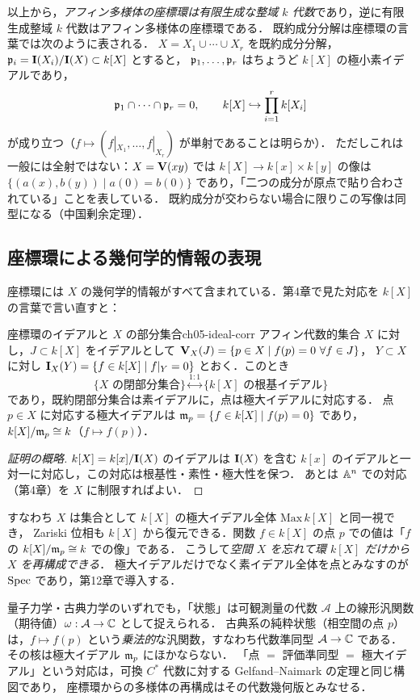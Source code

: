 以上から，\emph{アフィン多様体の座標環は有限生成な整域 $k$ 代数}であり，逆に有限生成整域 $k$ 代数はアフィン多様体の座標環である．
既約成分分解は座標環の言葉では次のように表される．
$X=X_1\cup\cdots\cup X_r$ を既約成分分解，$\mathfrak{p}_i=\mathbf{I}(X_i)/\mathbf{I}(X)\subset k[X]$ とすると，
$\mathfrak{p}_1,\dots,\mathfrak{p}_r$ はちょうど $k[X]$ の極小素イデアルであり，
\[
  \mathfrak{p}_1\cap\cdots\cap\mathfrak{p}_r=0,\qquad k[X]\hookrightarrow \prod_{i=1}^r k[X_i]
\]
が成り立つ（$f\mapsto(f|_{X_1},\dots,f|_{X_r})$ が単射であることは明らか）．
ただしこれは一般には全射ではない：$X=\mathbf{V}(xy)$ では $k[X]\to k[x]\times k[y]$ の像は
$\{(a(x),b(y))\mid a(0)=b(0)\}$ であり，「二つの成分が原点で貼り合わされている」ことを表している．
既約成分が交わらない場合に限りこの写像は同型になる（中国剰余定理）．

\subsection{座標環による幾何学的情報の表現}

座標環には $X$ の幾何学的情報がすべて含まれている．第4章で見た対応を $k[X]$ の言葉で言い直すと：

\begin{myprop}{座標環のイデアルと $X$ の部分集合}{ch05-ideal-corr}
アフィン代数的集合 $X$ に対し，$J\subset k[X]$ をイデアルとして $\mathbf{V}_X(J)=\{p\in X\mid f(p)=0\ \forall f\in J\}$，
$Y\subset X$ に対し $\mathbf{I}_X(Y)=\{f\in k[X]\mid f|_Y=0\}$ とおく．このとき
\[
  \{X\text{ の閉部分集合}\}\overset{1:1}{\longleftrightarrow}\{k[X]\text{ の根基イデアル}\}
\]
であり，既約閉部分集合は素イデアルに，点は極大イデアルに対応する．
点 $p\in X$ に対応する極大イデアルは $\mathfrak{m}_p=\{f\in k[X]\mid f(p)=0\}$ であり，$k[X]/\mathfrak{m}_p\cong k$（$f\mapsto f(p)$）．
\end{myprop}

\begin{proof}[証明の概略]
$k[X]=k[x]/\mathbf{I}(X)$ のイデアルは $\mathbf{I}(X)$ を含む $k[x]$ のイデアルと一対一に対応し，この対応は根基性・素性・極大性を保つ．
あとは $\mathbb{A}^n$ での対応（第4章）を $X$ に制限すればよい．
\end{proof}

すなわち $X$ は集合として $k[X]$ の極大イデアル全体 $\mathrm{Max}\,k[X]$ と同一視でき，
Zariski 位相も $k[X]$ から復元できる．関数 $f\in k[X]$ の点 $p$ での値は「$f$ の $k[X]/\mathfrak{m}_p\cong k$ での像」である．
こうして\emph{空間 $X$ を忘れて環 $k[X]$ だけから $X$ を再構成できる}．
極大イデアルだけでなく素イデアル全体を点とみなすのが $\operatorname{Spec}$ であり，第12章で導入する．

\begin{physbox}[状態と可観測量]
量子力学・古典力学のいずれでも，「状態」は可観測量の代数 $\mathcal A$ 上の線形汎関数（期待値）$\omega:\mathcal A\to\mathbb{C}$ として捉えられる．
古典系の純粋状態（相空間の点 $p$）は，$f\mapsto f(p)$ という\emph{乗法的}な汎関数，すなわち代数準同型 $\mathcal A\to\mathbb{C}$ である．
その核は極大イデアル $\mathfrak{m}_p$ にほかならない．
「点 $=$ 評価準同型 $=$ 極大イデアル」という対応は，可換 $C^*$ 代数に対する Gelfand--Naimark の定理と同じ構図であり，
座標環からの多様体の再構成はその代数幾何版とみなせる．
\end{physbox}

